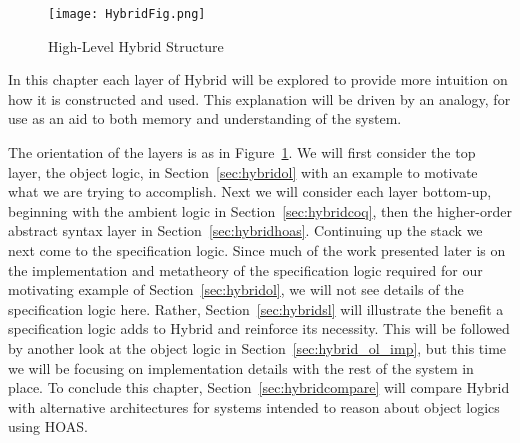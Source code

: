
%


\begin{figure}
\begin{center}
\texttt{[image: HybridFig.png]}
\caption{High-Level Hybrid Structure \label{fig:hybrid}}
\end{center}
\end{figure}

In this chapter each layer of Hybrid will be explored to provide more intuition on how it is constructed and used. This explanation will be driven by an analogy, for use as an aid to both memory and understanding of the system.

The orientation of the layers is as in Figure~\ref{fig:hybrid}. We will first consider the top layer, the object logic, in Section~\ref{sec:hybridol} with an example to motivate what we are trying to accomplish. Next we will consider each layer bottom-up, beginning with the ambient logic in Section~\ref{sec:hybridcoq}, then the higher-order abstract syntax layer in Section~\ref{sec:hybridhoas}. Continuing up the stack we next come to the specification logic. Since much of the work presented later is on the implementation and metatheory of the specification logic required for our motivating example of Section~\ref{sec:hybridol}, we will not see details of the specification logic here. Rather, Section~\ref{sec:hybridsl} will illustrate the benefit a specification logic adds to Hybrid and reinforce its necessity. This will be followed by another look at the object logic in Section~\ref{sec:hybrid_ol_imp}, but this time we will be focusing on implementation details with the rest of the system in place. To conclude this chapter, Section~\ref{sec:hybridcompare} will compare Hybrid with alternative architectures for systems intended to reason about object logics using HOAS.


